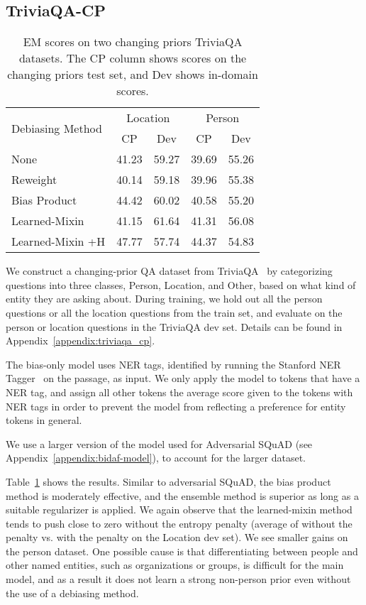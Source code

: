 \documentclass[11pt,a4paper]{article}
\begin{document}
\subsection{TriviaQA-CP}
\label{sect:triviaqa_cp}
\begin{table}[]
    \centering
    \tablefont
\begin{tabular}{lcccc} \toprule
\multirow{2}{*}{Debiasing Method} & \multicolumn{2}{c}{Location} & \multicolumn{2}{c}{Person}\\
 & CP & Dev & CP & Dev\\ \midrule
None & 41.23 & 59.27 & 39.69 & 55.26 \\
Reweight & 40.14 & 59.18 & 39.96 & 55.38 \\
Bias Product & 44.42 & 60.02 & 40.58 & 55.20 \\
Learned-Mixin & 41.15 & 61.64 & 41.31 & 56.08 \\
Learned-Mixin +H & 47.77 & 57.74 & 44.37 & 54.83 \\
\bottomrule
\end{tabular}
    \caption{EM scores on two changing priors TriviaQA datasets. The CP column shows scores on the changing priors test set, and Dev shows in-domain scores.}
    \label{tab:triviaqa_cp}
\end{table}
 We construct a changing-prior QA dataset from TriviaQA~\cite{joshi2017triviaqa} by categorizing questions into three classes, Person, Location, and Other, based on what kind of entity they are asking about.
During training, we hold out all the person questions or all the location questions from the train set, and evaluate on the person or location questions in the TriviaQA dev set. Details can be found in Appendix~\ref{appendix:triviaqa_cp}. 

 The bias-only model uses NER tags, identified by running the Stanford NER Tagger~\cite{corenlp_ner} on the passage, as input. We only apply the model to tokens that have a NER tag, and assign all other tokens the average score given to the tokens with NER tags in order to prevent the model from reflecting a preference for entity tokens in general.

We use a larger version of the model used for Adversarial SQuAD (see Appendix~\ref{appendix:bidaf-model}), to account for the larger dataset.

 Table~\ref{tab:triviaqa_cp} shows the results. Similar to adversarial SQuAD, the bias product method is moderately effective, and the ensemble method is superior as long as a suitable regularizer is applied. We again observe that the learned-mixin method tends to push  close to zero without the entropy penalty (average of  without the penalty vs.  with the penalty on the Location dev set). We see smaller gains on the person dataset. One possible cause is that differentiating between people and other named entities, such as organizations or groups, is difficult for the main model, and as a result it does not learn a strong non-person prior even without the use of a debiasing method.
\end{document}

